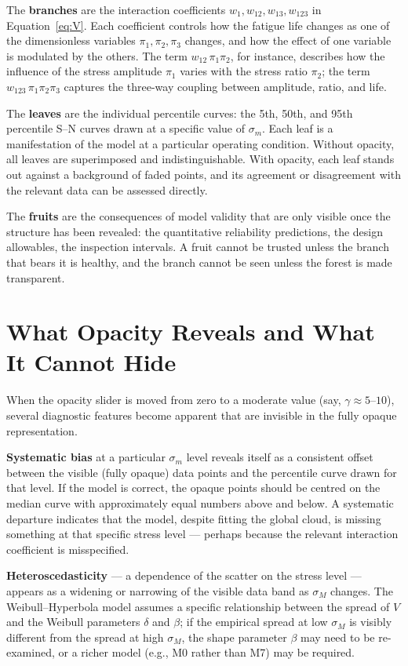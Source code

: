 The \textbf{branches} are the interaction coefficients $w_1, w_{12}, w_{13}, w_{123}$ in Equation~\eqref{eq:V}. Each coefficient controls how the fatigue life changes as one of the dimensionless variables $\pi_1, \pi_2, \pi_3$ changes, and how the effect of one variable is modulated by the others. The term $w_{12}\,\pi_1\pi_2$, for instance, describes how the influence of the stress amplitude $\pi_1$ varies with the stress ratio $\pi_2$; the term $w_{123}\,\pi_1\pi_2\pi_3$ captures the three-way coupling between amplitude, ratio, and life.

The \textbf{leaves} are the individual percentile curves: the 5th, 50th, and 95th percentile S--N curves drawn at a specific value of $\sigma_m$. Each leaf is a manifestation of the model at a particular operating condition. Without opacity, all leaves are superimposed and indistinguishable. With opacity, each leaf stands out against a background of faded points, and its agreement or disagreement with the relevant data can be assessed directly.

The \textbf{fruits} are the consequences of model validity that are only visible once the structure has been revealed: the quantitative reliability predictions, the design allowables, the inspection intervals. A fruit cannot be trusted unless the branch that bears it is healthy, and the branch cannot be seen unless the forest is made transparent.

\section{What Opacity Reveals and What It Cannot Hide}

When the opacity slider is moved from zero to a moderate value (say, $\gamma \approx 5$--$10$), several diagnostic features become apparent that are invisible in the fully opaque representation.

\textbf{Systematic bias} at a particular $\sigma_m$ level reveals itself as a consistent offset between the visible (fully opaque) data points and the percentile curve drawn for that level. If the model is correct, the opaque points should be centred on the median curve with approximately equal numbers above and below. A systematic departure indicates that the model, despite fitting the global cloud, is missing something at that specific stress level — perhaps because the relevant interaction coefficient is misspecified.

\textbf{Heteroscedasticity} — a dependence of the scatter on the stress level — appears as a widening or narrowing of the visible data band as $\sigma_M$ changes. The Weibull--Hyperbola model assumes a specific relationship between the spread of $V$ and the Weibull parameters $\delta$ and $\beta$; if the empirical spread at low $\sigma_M$ is visibly different from the spread at high $\sigma_M$, the shape parameter $\beta$ may need to be re-examined, or a richer model (e.g., M0 rather than M7) may be required.

